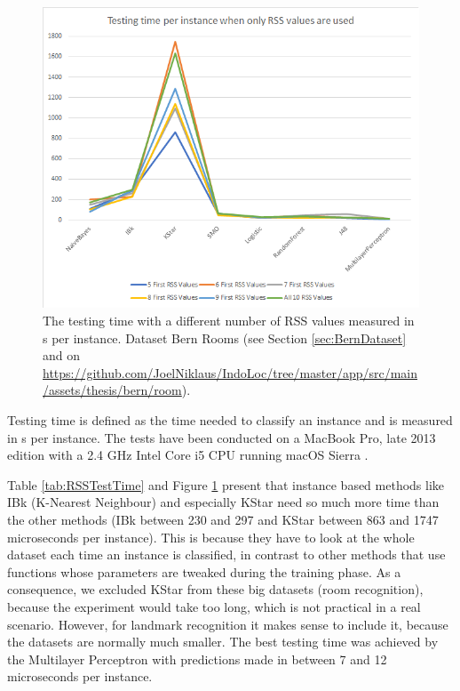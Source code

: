 \begin{figure}[H]
\centering
\includegraphics[width=150mm]{Figures/RssTestTime.png}
\decoRule
\caption[RSS Testing Time]{The testing time with a different number of RSS values measured in \textmu s per instance. Dataset Bern Rooms (see Section \ref{sec:BernDataset} and on \url{https://github.com/JoelNiklaus/IndoLoc/tree/master/app/src/main/assets/thesis/bern/room}).}
\label{fig:RSSTestTime}
\end{figure}

Testing time is defined as the time needed to classify an instance and is measured in \textmu s per instance. The tests have been conducted on a MacBook Pro, late 2013 edition with a 2.4 GHz Intel Core i5 CPU running macOS Sierra .

Table \ref{tab:RSSTestTime} and Figure \ref{fig:RSSTestTime} present that instance based methods like IBk (K-Nearest Neighbour) and especially KStar need so much more time than the other methods (IBk between 230 and 297 and KStar between 863 and 1747 microseconds per instance). This is because they have to look at the whole dataset each time an instance is classified, in contrast to other methods that use functions whose parameters are tweaked during the training phase. As a consequence, we excluded KStar from these big datasets (room recognition), because the experiment would take too long, which is not practical in a real scenario. However, for landmark recognition it makes sense to include it, because the datasets are normally much smaller.
The best testing time was achieved by the Multilayer Perceptron with predictions made in between 7 and 12 microseconds per instance.




